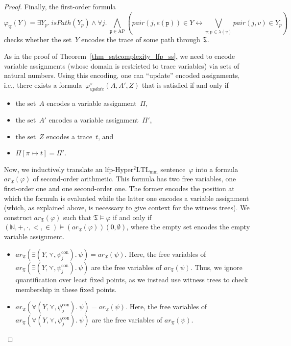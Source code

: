 \documentclass[dvipsnames,10pt,a4paper]{amsart}
\theoremstyle{definition}
\theoremstyle{remark}
\newcommand{\nats}{\mathbb{N}}
\renewcommand{\phi}{\varphi}
\newcommand{\lfpsohyltlfp}{\mathrm{lfp\text{-}{Hyper^2LTL_{\mathrm{mm}}}}\xspace}
\newcommand{\ap}[0]{\mathrm{AP}}
\newcommand{\smallest}{\curlyvee}
\newcommand{\myquot}[1]{``#1''}
\newcommand{\tsys}{\mathfrak{T}}
\newcommand{\proposition}{\texttt{p}}
\newcommand{\arithmetize}{{\mathit{ar}}}
\newcommand{\pair}{\mathit{pair}}
\newcommand{\update}{\mathit{update}}
\newcommand{\ispath}{\mathit{isPath}}
\newcommand{\natsstruct}{(\nats, +, \cdot, <, \in)}
\newcommand{\con}{\mathrm{con}}
\begin{document}
\begin{proof}
Finally, the first-order formula
\[
\phi_{\tsys}(Y) = \exists Y_p.\ \ispath(Y_p) \wedge \forall j.\ \bigwedge_{\proposition\in\ap} \left( \pair(j,e(\proposition))\in Y \leftrightarrow \bigvee_{v\colon \proposition \in \lambda(v)} \pair(j,v) \in Y_p\right)
\]
checks whether the set~$Y$ encodes the trace of some path through $\tsys$.

As in the proof of Theorem~\ref{thm_satcomplexity_lfp_ss}, we need to encode variable assignments (whose domain is restricted to trace variables) via sets of natural numbers. 
Using this encoding, one can \myquot{update} encoded assignments, i.e., there exists a formula~$\phi_{\update}^\pi(A,A',Z)$ that is satisfied if and only if
\begin{itemize}
    \item the set~$A$ encodes a variable assignment~$\Pi$,
    \item the set~$A'$ encodes a variable assignment~$\Pi'$,
    \item the set~$Z$ encodes a trace~$t$, and
    \item $\Pi[\pi\mapsto t] = \Pi'$.
\end{itemize}

Now, we inductively translate an $\lfpsohyltlfp$ sentence~$\phi$ into a formula~$\arithmetize_\tsys(\phi)$ of second-order arithmetic.
This formula has two free variables, one first-order one and one second-order one.
The former encodes the position at which the formula is evaluated while the latter one encodes a variable assignment (which, as explained above, is necessary to give context for the witness trees).  
We construct $\arithmetize_\tsys(\phi)$ such that 
$\tsys \models \phi$ if and only if $\natsstruct\models (\arithmetize_\tsys(\phi))(0,\emptyset)$, where the empty set encodes the empty variable assignment.

\begin{itemize}
    
    \item $\arithmetize_\tsys(\exists (Y,\smallest,\psi_j^\con).\ \psi) = \arithmetize_\tsys(\psi)$. Here, the free variables of $\arithmetize_\tsys(\exists (Y,\smallest,\psi_j^\con).\ \psi)$ are the free variables of $\arithmetize_\tsys(\psi)$. Thus, we ignore quantification over least fixed points, as we instead use witness trees to check membership in these fixed points.
    
    \item $\arithmetize_\tsys(\forall (Y,\smallest,\psi_j^\con).\ \psi) = \arithmetize_\tsys(\psi)$. Here, the free variables of $\arithmetize_\tsys(\forall (Y,\smallest,\psi_j^\con).\ \psi)$ are the free variables of $\arithmetize_\tsys(\psi)$. 
    

\end{itemize}
\end{proof}
\end{document}
